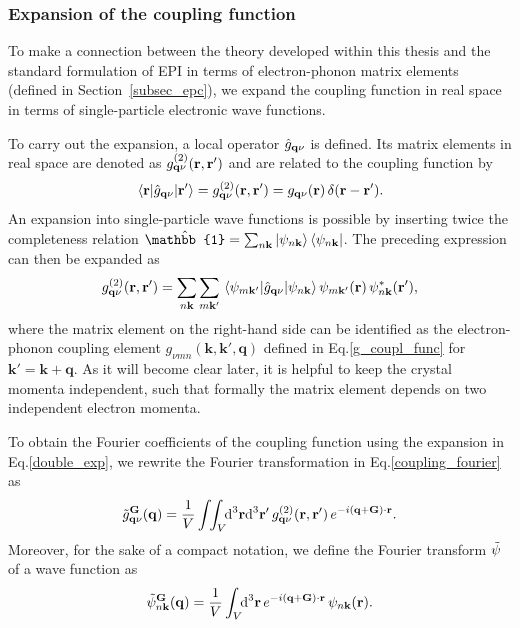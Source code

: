 \subsubsection{Expansion of the coupling function}
To make a connection between the theory developed within this thesis and the standard formulation of EPI in terms of electron-phonon matrix elements (defined in Section~\ref{subsec_epc}), we expand the coupling function in real space in terms of single-particle electronic wave functions.\par 
To carry out the expansion, a local operator $\hat{g}_{\mathbf{q}\nu}$ is defined. Its matrix elements in real space are denoted as $g^{(2)}_{\mathbf{q}\nu}(\mathbf{r,r'})$ and are related to the coupling function by
%
\begin{align}
    \mel{\mathbf{r}}{\hat{g}_{\mathbf{q}\nu}}{\mathbf{r'}} = g^{(2)}_{\mathbf{q}\nu}(\mathbf{r,r'}) = g_{\mathbf{q}\nu}(\mathbf{r})\,\delta(\mathbf{r-r'}).
\end{align}
%
An expansion into single-particle wave functions is possible by inserting twice the completeness relation $ \hat{\mathbb{1}} = \sum_{n\k}\ket{\psi_{n\k}}\bra{\psi_{n\k}}$.
%
The preceding expression can then be expanded as 
%
\begin{align}\label{double_exp}
    g^{(2)}_{\mathbf{q}\nu}(\mathbf{r,r'}) = \sum_{n\mathbf{k}}\sum_{m\mathbf{k'}} \mel{\psi_{m\mathbf{k'}}}{\hat{g}_{\mathbf{q}\nu}}{\psi_{n\mathbf{k}}}\psi_{m\mathbf{k'}}(\mathbf{r})\,\psi^*_{n\mathbf{k}}(\mathbf{r'}),
\end{align}
%
where the matrix element on the right-hand side can be identified as the electron-phonon coupling element $g_{\nu mn}(\mathbf{k,k',q})$ defined in Eq.\;\eqref{g_coupl_func} for $\mathbf{k'=k+q}$. As it will become clear later, it is helpful to keep the crystal momenta independent, such that formally the matrix element depends on two independent electron momenta.\par 
To obtain the Fourier coefficients of the coupling function using the expansion in Eq.\;\eqref{double_exp}, we rewrite the Fourier transformation in Eq.\;\eqref{coupling_fourier} as
%
\begin{align}\label{double_fourier}
     \Tilde{g}_{\mathbf{q}\nu}^{\mathbf{G}}(\mathbf{q}) = \frac{1}{V} \int\!\!\int_V\text{\!\!d}^3\mathbf{r} \text{d}^3\mathbf{r'} \,g^{(2)}_{\mathbf{q}\nu}(\mathbf{r,r'})\,e^{-i(\mathbf{q}+\mathbf{G})\cdot\mathbf{r}}.
\end{align}
%
Moreover, for the sake of a compact notation, we define the Fourier transform $\Tilde{\psi}$ of a wave function as
%
\begin{align}\label{fourier_wave}
    \Tilde{\psi}_{n\mathbf{k}}^{\mathbf{G}}(\mathbf{q}) = \frac{1}{V}\int_V\text{\!\!d}^3\mathbf{r}\,e^{-i(\mathbf{q}+\mathbf{G})\cdot\mathbf{r}}\,\psi_{n\mathbf{k}}(\mathbf{r}).
\end{align}
